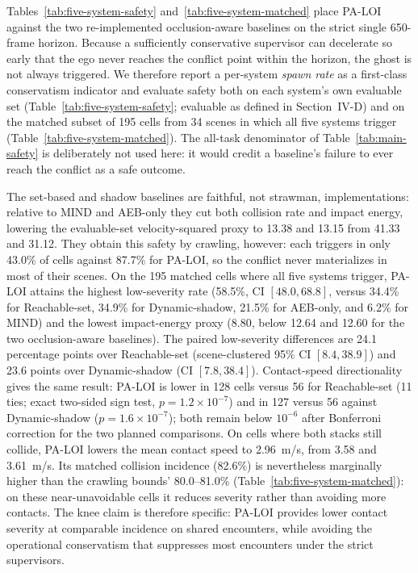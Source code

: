 \documentclass[journal]{IEEEtran}
\begin{document}
Tables~\ref{tab:five-system-safety} and~\ref{tab:five-system-matched} place PA-LOI against the two re-implemented occlusion-aware baselines on the strict single 650-frame horizon. Because a sufficiently conservative supervisor can decelerate so early that the ego never reaches the conflict point within the horizon, the ghost is not always triggered. We therefore report a per-system \emph{spawn rate} as a first-class conservatism indicator and evaluate safety both on each system's own evaluable set (Table~\ref{tab:five-system-safety}; evaluable as defined in Section~IV-D) and on the matched subset of 195 cells from 34 scenes in which all five systems trigger (Table~\ref{tab:five-system-matched}). The all-task denominator of Table~\ref{tab:main-safety} is deliberately not used here: it would credit a baseline's failure to ever reach the conflict as a safe outcome.

The set-based and shadow baselines are faithful, not strawman, implementations: relative to MIND and AEB-only they cut both collision rate and impact energy, lowering the evaluable-set velocity-squared proxy to 13.38 and 13.15 from 41.33 and 31.12. They obtain this safety by crawling, however: each triggers in only 43.0\% of cells against 87.7\% for PA-LOI, so the conflict never materializes in most of their scenes. On the 195 matched cells where all five systems trigger, PA-LOI attains the highest low-severity rate (58.5\%, CI $[48.0, 68.8]$, versus 34.4\% for Reachable-set, 34.9\% for Dynamic-shadow, 21.5\% for AEB-only, and 6.2\% for MIND) and the lowest impact-energy proxy (8.80, below 12.64 and 12.60 for the two occlusion-aware baselines). The paired low-severity differences are 24.1 percentage points over Reachable-set (scene-clustered 95\% CI $[8.4,38.9]$) and 23.6 points over Dynamic-shadow (CI $[7.8,38.4]$). Contact-speed directionality gives the same result: PA-LOI is lower in 128 cells versus 56 for Reachable-set (11 ties; exact two-sided sign test, $p=1.2\times10^{-7}$) and in 127 versus 56 against Dynamic-shadow ($p=1.6\times10^{-7}$); both remain below $10^{-6}$ after Bonferroni correction for the two planned comparisons. On cells where both stacks still collide, PA-LOI lowers the mean contact speed to \SI{2.96}{m/s}, from 3.58 and \SI{3.61}{m/s}. Its matched collision incidence (82.6\%) is nevertheless marginally higher than the crawling bounds' 80.0--81.0\% (Table~\ref{tab:five-system-matched}): on these near-unavoidable cells it reduces severity rather than avoiding more contacts. The knee claim is therefore specific: PA-LOI provides lower contact severity at comparable incidence on shared encounters, while avoiding the operational conservatism that suppresses most encounters under the strict supervisors.
\end{document}
